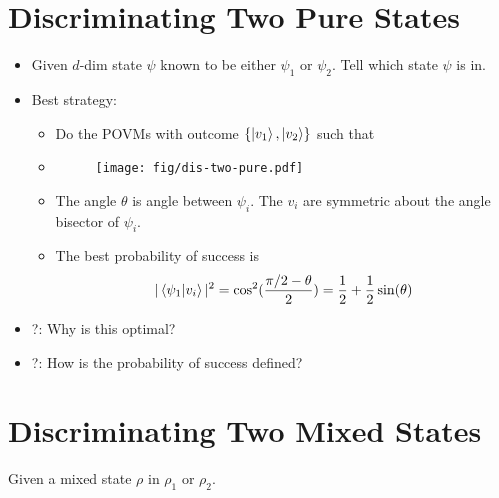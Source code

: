 \documentclass{article}
\begin{document}
\section{Discriminating Two Pure States}
\label{sec:Discriminating Two Pure States}
\begin{itemize}
  \item Given $d$-dim state $\psi$ known to be either $\psi_1$ or $\psi_2$.
    Tell which state $\psi$ is in.
  \item Best strategy:
    \begin{itemize}
      \item Do the POVMs with outcome $\{\ket{v_1},\ket{v_2}\}$ such that
      \item \begin{figure}[H]
            \centering
            \texttt{[image: fig/dis-two-pure.pdf]}
        \end{figure}
      \item The angle $\theta$ is angle between $\psi_i$. The $v_i$ are
        symmetric about the angle bisector of $\psi_i$.
      \item The best probability of success is
        \begin{equation}
          |\braket{\psi_1|v_i}|^2 
          = \cos^2(\frac{\pi/2-\theta}{2}) = \frac{1}{2} + \frac{1}{2}\sin(\theta)
        \end{equation}
    \end{itemize}
  \item ?: Why is this optimal?
  \item ?: How is the probability of success defined?
\end{itemize}

\section{Discriminating Two Mixed States}
\label{sec:Discriminating Two Mixed States}
Given a mixed state $\rho$ in $\rho_1$ or $\rho_2$.
\end{document}
